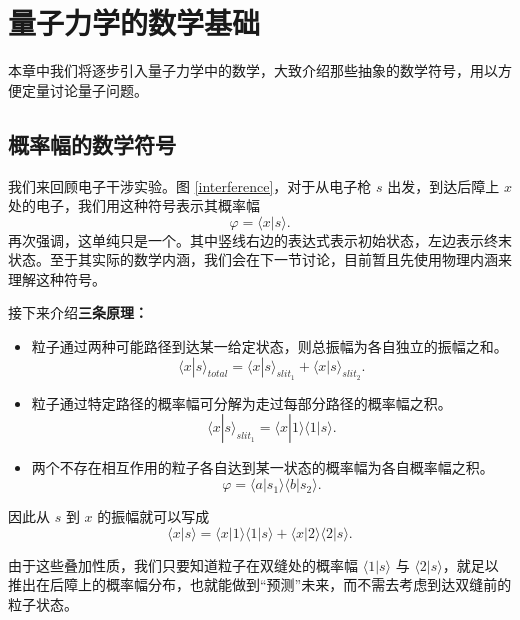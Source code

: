\documentclass[12pt,a4paper,oneside]{book}
\begin{document}
\chapter{量子力学的数学基础}
本章中我们将逐步引入量子力学中的数学，大致介绍那些抽象的数学符号，用以方便定量讨论量子问题。

\section{概率幅的数学符号}



我们来回顾电子干涉实验。图 \ref{interference}，对于从电子枪 $s$ 出发，到达后障上 $x$ 处的电子，我们用这种符号表示其概率幅
\begin{equation}
    \varphi=\langle x | s \rangle. 
\end{equation}
再次强调，这单纯只是一个。其中竖线右边的表达式表示初始状态，左边表示终末状态。至于其实际的数学内涵，我们会在下一节讨论，目前暂且先使用物理内涵来理解这种符号。

接下来介绍\textbf{三条原理：}\begin{itemize}
    \item 粒子通过两种可能路径到达某一给定状态，则总振幅为各自独立的振幅之和。
    \begin{equation}
        \langle x | s \rangle_{total} = \langle x | s \rangle_{slit_1}+\langle x | s \rangle_{slit_2}. 
    \end{equation} 
    \item 粒子通过特定路径的概率幅可分解为走过每部分路径的概率幅之积。
    \begin{equation}
        \langle x | s \rangle_{slit_1}=\langle x | 1 \rangle\langle 1 | s \rangle.
    \end{equation}
    \item 两个不存在相互作用的粒子各自达到某一状态的概率幅为各自概率幅之积。
    \begin{equation}
        \varphi=\langle a | s_1 \rangle\langle b | s_2 \rangle.
    \end{equation}
\end{itemize}

因此从 $s$ 到 $x$ 的振幅就可以写成
\begin{equation}
    \langle x | s \rangle= \langle x | 1 \rangle\langle 1 | s \rangle + \langle x | 2 \rangle\langle 2 | s \rangle.
\end{equation}

由于这些叠加性质，我们只要知道粒子在双缝处的概率幅 $\langle 1 | s \rangle$ 与 $\langle 2 | s \rangle$，就足以推出在后障上的概率幅分布，也就能做到“预测”未来，而不需去考虑到达双缝前的粒子状态。
\end{document}
